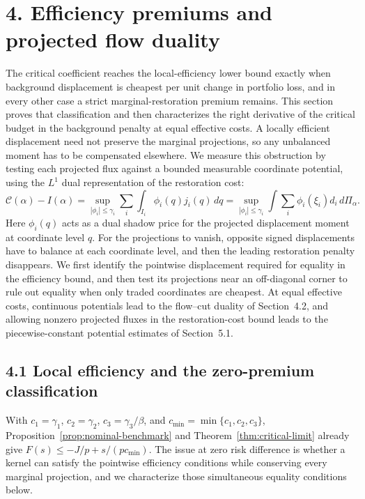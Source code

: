 \section{4. Efficiency premiums and projected flow duality}\label{sec:efficiency-premiums}

The critical coefficient reaches the local-efficiency lower bound exactly when background displacement is cheapest per unit change in portfolio loss, and in every other case a strict marginal-restoration premium remains. This section proves that classification and then characterizes the right derivative of the critical budget in the background penalty at equal effective costs. A locally efficient displacement need not preserve the marginal projections, so any unbalanced moment has to be compensated elsewhere. We measure this obstruction by testing each projected flux against a bounded measurable coordinate potential, using the \(L^1\) dual representation of the restoration cost:
\[
\mathcal C(\alpha)-I(\alpha)
=\sup_{|\phi_i|\le\gamma_i}\sum_i\int_{I_i}\phi_i(q)j_i(q)\,dq
=\sup_{|\phi_i|\le\gamma_i}\int\sum_i\phi_i(\xi_i)d_i\,d\Pi_\alpha.
\]
Here \(\phi_i(q)\) acts as a dual shadow price for the projected displacement moment at coordinate level \(q\). For the projections to vanish, opposite signed displacements have to balance at each coordinate level, and then the leading restoration penalty disappears. We first identify the pointwise displacement required for equality in the efficiency bound, and then test its projections near an off-diagonal corner to rule out equality when only traded coordinates are cheapest. At equal effective costs, continuous potentials lead to the flow--cut duality of Section~4.2, and allowing nonzero projected fluxes in the restoration-cost bound leads to the piecewise-constant potential estimates of Section~5.1.

\subsection{4.1 Local efficiency and the zero-premium classification}\label{sec:zero-premium}

With \(c_1=\gamma_1\), \(c_2=\gamma_2\), \(c_3=\gamma_3/\beta\), and \(c_{\min}=\min\{c_1,c_2,c_3\}\), Proposition~\ref{prop:nominal-benchmark} and Theorem~\ref{thm:critical-limit} already give \(F(s)\le-J/p+s/(pc_{\min})\). The issue at zero risk difference is whether a kernel can satisfy the pointwise efficiency conditions while conserving every marginal projection, and we characterize those simultaneous equality conditions below.

